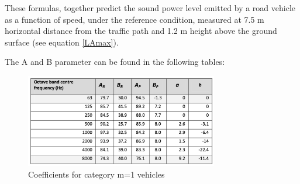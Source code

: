 \documentclass{article}
\begin{document}
\noindent These formulas, together predict the sound power level emitted by a road vehicle as a function of speed, under the reference condition, measured at 7.5 m horizontal distance from the traffic path and 1.2 m height above the ground surface (see equation \ref{LAmax}).

\noindent The A and B parameter can be found in the following tables:

\begin{figure}[H]
\caption{Coefficients for category m=1 vehicles}
\label{Coefficients for category m=1 vehicles}
\centering
\includegraphics[width=0.75\textwidth]{CNOSSOS/Coefficients for category m=1 vehicles.png}
\end{figure}
\end{document}
